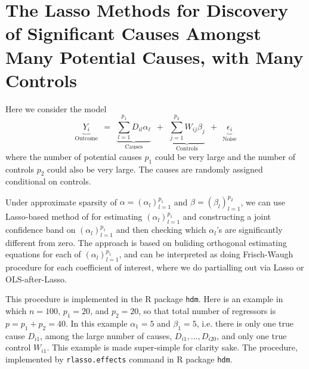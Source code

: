 \documentclass{amsart}\usepackage[]{graphicx}\usepackage[]{color}
\begin{document}
\section{The Lasso Methods for Discovery of Significant
Causes Amongst Many Potential Causes, with Many Controls}
Here we consider the model
$$
\underbrace{Y_{i}}_{\mathrm{Outcome}} \ \ =  \ \ \underbrace{\sum_{l=1}^{p_1} D_{il} \alpha_\ell}_{
\mathrm{Causes}} \ \ + \ \ \underbrace{\sum_{j=1}^{p_2} 
W_{ij} \beta_j}_{\mathrm{Controls}} \ \ + \ \ \underbrace{\epsilon_i}_{\mathrm{Noise}}
$$
where the number of potential causes $p_1$ could be very large and the number of controls $p_2$ could also be very large. The causes are randomly assigned conditional on controls.

Under approximate sparsity of $ \alpha = (\alpha_l)_{l=1}^{p_1}$
and $\beta = (\beta_l)_{l=1}^{p_2}$, we can use Lasso-based method of \cite{BCK2014} for
estimating $(\alpha_l)_{l=1}^{p_1}$ and constructing a joint confidence band on  $(\alpha_l)_{l=1}^{p_1}$ and then checking which $\alpha_l$'s are significantly different from zero. The approach is based on buliding orthogonal estimating equations for each of $(\alpha_l)_{l=1}^{p_1}$, and can be interpreted as doing Frisch-Waugh procedure for each coefficient of interest, where we do partialling out via Lasso or OLS-after-Lasso.


This procedure is implemented in the R package \texttt{hdm}. Here is
an example in which $n=100$, $p_1=20$, and $p_2=20$, so that total number of regressors is $p = p_1 + p_2 = 40$.  In this example $\alpha_1 =5$ and $\beta_1 = 5$, i.e. there is only
one true cause $D_{i1}$, among the large number of causes, $D_{i1},..., D_{i20}$, and only one true control $W_{i1}$.   This example is made super-simple for clarity sake. The \cite{BCK2014} procedure, implemented by \texttt{rlasso.effects} command in R package \texttt{hdm}. 
\end{document}
